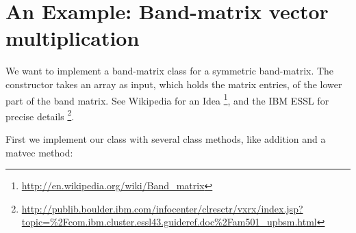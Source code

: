 \documentclass[letterpaper,10pt,english]{manual}
\begin{document}
\section{An Example: Band-matrix vector multiplication}

We want to implement a band-matrix class for a symmetric band-matrix.
The constructor  takes an array as input, which holds the matrix
entries, of the lower part of the band matrix. See Wikipedia for
an Idea \footnote{
\href{http://en.wikipedia.org/wiki/Band\_matrix}{http://en.wikipedia.org/wiki/Band\_matrix}
}, and the IBM ESSL for precise details \footnote{
\href{http://publib.boulder.ibm.com/infocenter/clresctr/vxrx/index.jsp?topic=\%2Fcom.ibm.cluster.essl43.guideref.doc\%2Fam501\_upbsm.html}{http://publib.boulder.ibm.com/infocenter/clresctr/vxrx/index.jsp?topic=\%2Fcom.ibm.cluster.essl43.guideref.doc\%2Fam501\_upbsm.html}
}.

First we implement our class with several class methods, like
addition and a matvec method:
\end{document}
